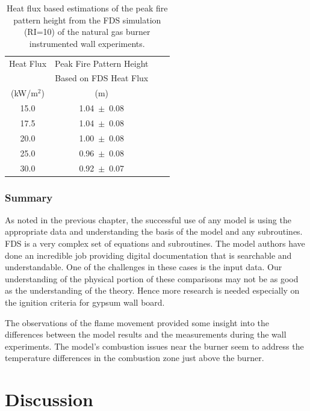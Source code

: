\documentclass[twoside]{uocthesis}
\begin{document}
{\begin{table}[h]
  \small
  \centering
  \begin{tabular}{|c|c|c|c|} \hline 
Heat Flux 		&  Peak Fire Pattern Height  	      		  \\
    			&  Based on FDS Heat Flux    	  	  	  \\
    (kW/m$^2$)			&  (m) 					 				   \\ 
\hline    15.0			&  1.04~$\pm$~0.08       		            \\
\hline    17.5			&  1.04~$\pm$~0.08							    \\
\hline    20.0			&  1.00~$\pm$~0.08								\\
\hline	  25.0			&  0.96~$\pm$~0.08							   	  \\
\hline    30.0   		&  0.92~$\pm$~0.07							\\  \hline
  \end{tabular}
  \caption[Heat flux based estimations of the peak fire pattern height from the FDS simulation (RI=10) of the natural gas burner instrumented wall experiments.]{Heat flux based estimations of the peak fire pattern height from the FDS simulation (RI=10) of the natural gas burner instrumented wall experiments.}
  \label{tab:FDS_CriticalHF_IWNG}
\end{table}

\subsection{Summary}

As noted in the previous chapter, the successful use of any model is using the appropriate data and understanding the basis of the model and any subroutines.  FDS is a very complex set of equations and subroutines.  The model authors have done an incredible job providing digital documentation that is searchable and understandable.  One of the  challenges in these cases is the input data.  Our understanding of the physical portion of these comparisons may not be as good as the understanding of the theory. Hence more research is needed especially on the ignition criteria for gypsum wall board. 

The observations of the flame movement provided some insight into the differences between the model results and the measurements during the wall experiments.  The model's combustion issues near the burner seem to address the temperature differences in the combustion zone just above the burner.    

\chapter{Discussion}

}
\end{document}
